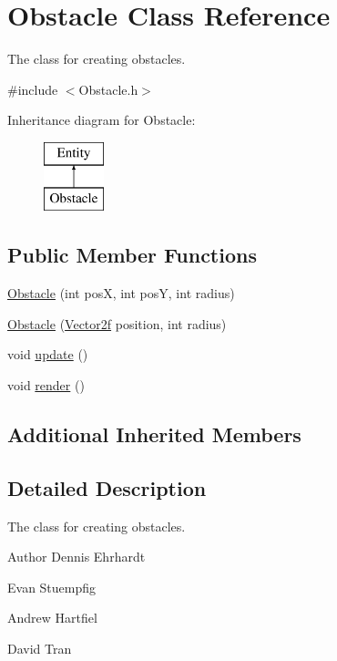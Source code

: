\hypertarget{classObstacle}{\section{Obstacle Class Reference}
\label{classObstacle}
}


The class for creating obstacles.  




{\ttfamily \#include $<$Obstacle.\-h$>$}

Inheritance diagram for Obstacle\-:\begin{figure}[H]
\begin{center}
\leavevmode
\includegraphics[height=2.000000cm]{classObstacle}
\end{center}
\end{figure}
\subsection*{Public Member Functions}
\begin{DoxyCompactItemize}
\item 
\hyperlink{classObstacle_a54f7a6e679d123958539eabe85694656}{Obstacle} (int pos\-X, int pos\-Y, int radius)
\item 
\hyperlink{classObstacle_a2ccff96a4ddb5aee99504a9f90061f32}{Obstacle} (\hyperlink{classVector2}{Vector2f} position, int radius)
\item 
void \hyperlink{classObstacle_a3fe041a93f5b2e9e5c5750bcef2382a4}{update} ()
\item 
void \hyperlink{classObstacle_ab5dc508912a5c772e8a9c732c9db5c24}{render} ()
\end{DoxyCompactItemize}
\subsection*{Additional Inherited Members}


\subsection{Detailed Description}
The class for creating obstacles. 

\begin{DoxyAuthor}{Author}
Dennis Ehrhardt 

Evan Stuempfig 

Andrew Hartfiel 

David Tran 
\end{DoxyAuthor}


